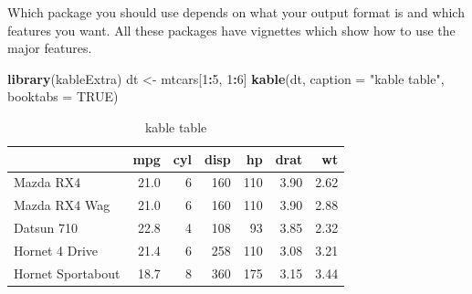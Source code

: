 \documentclass[]{book}
\newenvironment{Shaded}{\begin{snugshade}}{\end{snugshade}}
\newcommand{\KeywordTok}[1]{\textcolor[rgb]{0.13,0.29,0.53}{\textbf{#1}}}
\newcommand{\DataTypeTok}[1]{\textcolor[rgb]{0.13,0.29,0.53}{#1}}
\newcommand{\DecValTok}[1]{\textcolor[rgb]{0.00,0.00,0.81}{#1}}
\newcommand{\StringTok}[1]{\textcolor[rgb]{0.31,0.60,0.02}{#1}}
\newcommand{\OtherTok}[1]{\textcolor[rgb]{0.56,0.35,0.01}{#1}}
\newcommand{\OperatorTok}[1]{\textcolor[rgb]{0.81,0.36,0.00}{\textbf{#1}}}
\newcommand{\NormalTok}[1]{#1}
\begin{document}
Which package you should use depends on what your output format is and
which features you want. All these packages have vignettes which show
how to use the major features.

\begin{Shaded}
\begin{Highlighting}[]
\KeywordTok{library}\NormalTok{(kableExtra)}
\NormalTok{dt <-}\StringTok{ }\NormalTok{mtcars[}\DecValTok{1}\OperatorTok{:}\DecValTok{5}\NormalTok{, }\DecValTok{1}\OperatorTok{:}\DecValTok{6}\NormalTok{]}
\KeywordTok{kable}\NormalTok{(dt, }\DataTypeTok{caption =} \StringTok{"kable table"}\NormalTok{, }\DataTypeTok{booktabs =} \OtherTok{TRUE}\NormalTok{)}
\end{Highlighting}
\end{Shaded}

\begin{table}[t]

\caption{\label{tab:kable}kable table}
\centering
\begin{tabular}{lrrrrrr}
\toprule
  & mpg & cyl & disp & hp & drat & wt\\
\midrule
Mazda RX4 & 21.0 & 6 & 160 & 110 & 3.90 & 2.62\\
Mazda RX4 Wag & 21.0 & 6 & 160 & 110 & 3.90 & 2.88\\
Datsun 710 & 22.8 & 4 & 108 & 93 & 3.85 & 2.32\\
Hornet 4 Drive & 21.4 & 6 & 258 & 110 & 3.08 & 3.21\\
Hornet Sportabout & 18.7 & 8 & 360 & 175 & 3.15 & 3.44\\
\bottomrule
\end{tabular}
\end{table}

\begin{Shaded}
\end{Shaded}
\end{document}

